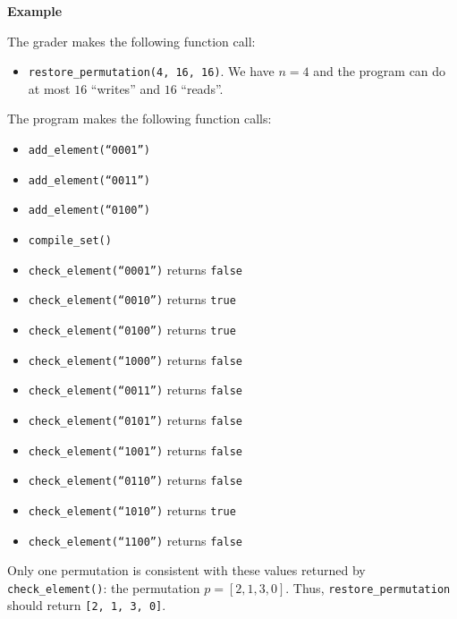 \textbf{Example}

The grader makes the following function call:

\begin{itemize}
\item \texttt{restore\_permutation(4, 16, 16)}. We have $n = 4$ and the program can do at most $16$ ``writes'' and $16$ ``reads''.
\end{itemize}

The program makes the following function calls:

\begin{itemize}
\item \texttt{add\_element(``0001'')}
\item \texttt{add\_element(``0011'')}
\item \texttt{add\_element(``0100'')}
\item \texttt{compile\_set()}
\item \texttt{check\_element(``0001'')} returns \texttt{false}
\item \texttt{check\_element(``0010'')} returns \texttt{true}
\item \texttt{check\_element(``0100'')} returns \texttt{true}
\item \texttt{check\_element(``1000'')} returns \texttt{false}
\item \texttt{check\_element(``0011'')} returns \texttt{false}
\item \texttt{check\_element(``0101'')} returns \texttt{false}
\item \texttt{check\_element(``1001'')} returns \texttt{false}
\item \texttt{check\_element(``0110'')} returns \texttt{false}
\item \texttt{check\_element(``1010'')} returns \texttt{true}
\item \texttt{check\_element(``1100'')} returns \texttt{false}
 \end{itemize}

Only one permutation is consistent with these values returned by \texttt{check\_element()}: the permutation 
$p = [2, 1, 3, 0]$. Thus, \texttt{restore\_permutation} should return \texttt{[2, 1, 3, 0]}.

